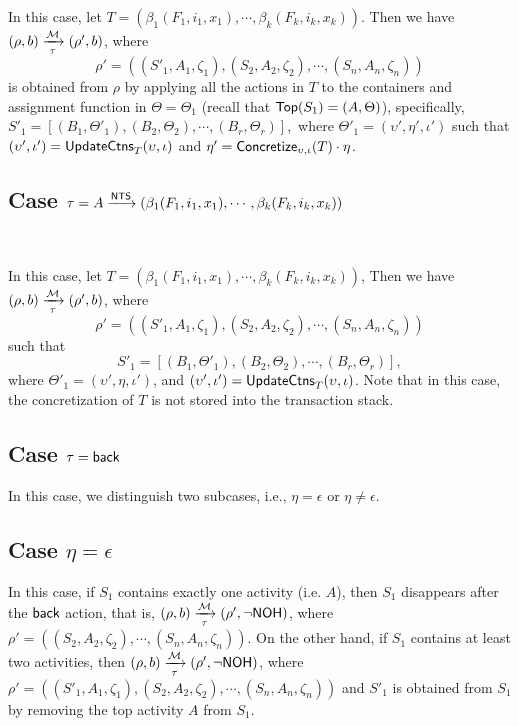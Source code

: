 In this case, 
let $T = (\beta_1(F_1, i_1, x_1), \cdots, \beta_k(F_k, i_k, x_k))$. 
Then we have $(\rho,b) \xrightarrow[\tau]{{\mathcal{M} }} (\rho',b)$, where
$$\rho' = ((S'_1, A_1,\zeta_1), (S_2, A_2,\zeta_2), \cdots, (S_n, A_n,\zeta_n))$$ is obtained from $\rho$ by applying all the actions in $T$ to the containers and assignment function in $\Theta=\Theta_1$ (recall that ${\sf Top}(S_1) = (A, \Theta)$), specifically,  
$S'_1 =[(B_1, \Theta'_1), (B_2, \Theta_2), \cdots, (B_r, \Theta_r)],$ 
where $\Theta'_1 = (\upsilon', \eta', \iota')$ such that $(\upsilon', \iota') = \mathsf{UpdateCtns}_{T}(\upsilon, \iota)$ and $\eta' = \mathsf{Concretize}_{\upsilon, \iota}(T) \cdot \eta$.

 

\subsection{Case $\tau = A \xrightarrow{{\sf NTS}} (\beta_1(F_1, i_1, x_1), \cdots, \beta_k(F_k, i_k, x_k))$}\ 

In this case, let $T = (\beta_1(F_1, i_1, x_1), \cdots, \beta_k(F_k, i_k, x_k))$,
Then we have $(\rho,b) \xrightarrow[\tau]{{\mathcal{M} }} (\rho',b)$, where
$$\rho' = ((S'_1, A_1,\zeta_1), (S_2, A_2,\zeta_2), \cdots, (S_n, A_n,\zeta_n))$$ such that 
$$S'_1 =[(B_1, \Theta'_1), (B_2, \Theta_2), \cdots, (B_r, \Theta_r)],$$ 
where $\Theta'_1 = (\upsilon', \eta, \iota')$, and $(\upsilon', \iota') = \mathsf{UpdateCtns}_{T}(\upsilon, \iota)$. Note that in this case, the concretization of $T$ is not stored into the transaction stack. 


\subsection{Case $\tau = {\mathsf{back} }$}
In this case, we distinguish two subcases, i.e., $\eta=\epsilon$ or $\eta\neq\epsilon$.
\subsection*{Case $\eta=\epsilon$}
In this case, if $S_1$ contains exactly one activity (i.e. $A$), then $S_1$ disappears after the ${\mathsf{back} }$ action, that is, $(\rho,b) \xrightarrow[\tau]{{\mathcal{M} }} (\rho',\neg{\sf NOH})$, where $\rho' = ((S_2, A_2,\zeta_2), \cdots, (S_n, A_n,\zeta_n))$.
On the other hand, if $S_1$ contains at least two activities, then $(\rho,b) \xrightarrow[\tau]{{\mathcal{M} }} (\rho',\neg{\sf NOH})$, where $\rho' = ((S'_1,A_1,\zeta_1), (S_2, A_2,\zeta_2), \cdots, (S_n, A_n,\zeta_n))$ and $S'_1$ is obtained from $S_1$ by removing the top activity $A$ from $S_1$.
